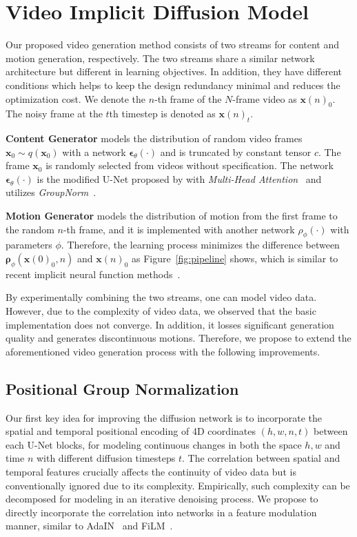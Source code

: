 \documentclass[letterpaper]{article}
\newcommand{\bx}{\mathbf{x}}
\newcommand{\bepsilon}{{\boldsymbol{\epsilon}}}
\newcommand{\brho}{{\boldsymbol{\rho}}}
\begin{document}
\section{Video Implicit Diffusion Model}
Our proposed video generation method consists of two streams for content and motion generation, respectively.
The two streams share a similar network architecture but different in learning objectives.  In addition, they have different conditions which helps to keep the design redundancy minimal and reduces the optimization cost. 
We denote the $n$-th frame of the $N$-frame video as $\bx(n)_0$. The noisy frame at the $t$th timestep is denoted as $\bx(n)_t$.

\noindent \textbf{Content Generator} models the distribution of random video frames $\bx_0\sim q(\bx_0)$ with a network $\bepsilon_\theta(\cdot)$ and is truncated by constant tensor $c$.
The frame $\bx_0$ is randomly selected from videos  without specification.
The network $\bepsilon_\theta(\cdot)$ is the modified U-Net proposed by \citet{dhariwal2021diffusion} with \emph{Multi-Head Attention}~\cite{vaswani2017attention} and utilizes \emph{GroupNorm}~\cite{wu2018group}.

\noindent \textbf{Motion Generator} models the distribution of motion from the first frame to the random $n$-th frame, and it is implemented with another network $\rho_\phi(\cdot)$ with parameters $\phi$.
Therefore, the learning process minimizes the difference between $\brho_\phi(\bx(0)_0, n)$ and $\bx(n)_0$ as Figure~\ref{fig:pipeline} shows, which is similar to recent implicit neural function methods~\cite{yu2022generating,skorokhodov2021stylegan}.

By experimentally combining the two streams, one can model video data.
However, due to the complexity of video data, we observed that the basic implementation does not converge.  In addition, it losses significant generation quality and generates discontinuous motions.
Therefore, we propose to extend the aforementioned video generation process with the following improvements.

\subsection{Positional Group Normalization}
Our first key idea for improving the diffusion network is to incorporate the spatial and temporal positional encoding of 4D coordinates $(h,w,n,t)$ between each U-Net blocks, for modeling continuous changes in both the space $h,w$ and time $n$ with different diffusion timesteps $t$.
The correlation between spatial and temporal features crucially affects the continuity of video data but is conventionally ignored due to its complexity.
Empirically, such complexity can be decomposed for modeling in an iterative denoising process. We propose to directly incorporate the correlation into networks in a feature modulation manner, similar to AdaIN~\cite{karras2019style} and FiLM~\cite{perez2018film}.
\end{document}
